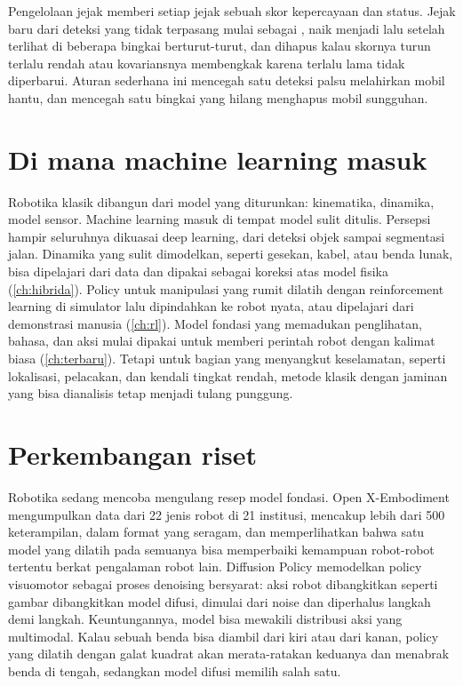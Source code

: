 Pengelolaan jejak memberi setiap jejak sebuah skor kepercayaan dan status. Jejak baru dari deteksi yang tidak terpasang
mulai sebagai , naik menjadi  lalu  setelah terlihat di beberapa bingkai
berturut-turut, dan dihapus kalau skornya turun terlalu rendah atau kovariansnya membengkak karena terlalu lama tidak
diperbarui. Aturan sederhana ini mencegah satu deteksi palsu melahirkan mobil hantu, dan mencegah satu bingkai yang
hilang menghapus mobil sungguhan.

\section{Di mana machine learning masuk}

Robotika klasik dibangun dari model yang diturunkan: kinematika, dinamika, model sensor. Machine learning masuk di tempat
model sulit ditulis. Persepsi hampir seluruhnya dikuasai deep learning, dari deteksi objek sampai segmentasi jalan.
Dinamika yang sulit dimodelkan, seperti gesekan, kabel, atau benda lunak, bisa dipelajari dari data dan dipakai sebagai
koreksi atas model fisika (\cref{ch:hibrida}). Policy untuk manipulasi yang rumit dilatih dengan reinforcement learning
di simulator lalu dipindahkan ke robot nyata, atau dipelajari dari demonstrasi manusia (\cref{ch:rl}). Model fondasi yang
memadukan penglihatan, bahasa, dan aksi mulai dipakai untuk memberi perintah robot dengan kalimat biasa
(\cref{ch:terbaru}). Tetapi untuk bagian yang menyangkut keselamatan, seperti lokalisasi, pelacakan, dan kendali tingkat
rendah, metode klasik dengan jaminan yang bisa dianalisis tetap menjadi tulang punggung.

\section{Perkembangan riset}

Robotika sedang mencoba mengulang resep model fondasi. Open X-Embodiment \citep{oxe2023} mengumpulkan data dari 22 jenis
robot di 21 institusi, mencakup lebih dari 500 keterampilan, dalam format yang seragam, dan memperlihatkan bahwa satu
model yang dilatih pada semuanya bisa memperbaiki kemampuan robot-robot tertentu berkat pengalaman robot lain.
Diffusion Policy \citep{chi2023} memodelkan policy visuomotor sebagai proses denoising bersyarat: aksi robot dibangkitkan
seperti gambar dibangkitkan model difusi, dimulai dari noise dan diperhalus langkah demi langkah. Keuntungannya, model bisa
mewakili distribusi aksi yang multimodal. Kalau sebuah benda bisa diambil dari kiri atau dari kanan, policy yang dilatih
dengan galat kuadrat akan merata-ratakan keduanya dan menabrak benda di tengah, sedangkan model difusi memilih salah satu.

